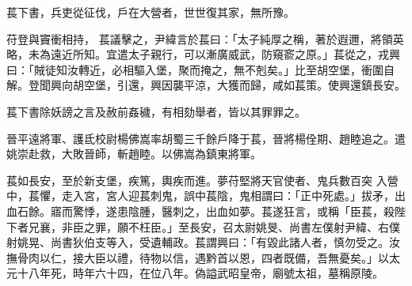 \begin{pinyinscope}
 萇下書，兵吏從征伐，戶在大營者，世世復其家，無所豫。



 苻登與竇衝相持，
 萇議擊之，尹緯言於萇曰：「太子純厚之稱，著於遐邇，將領英略，未為遠近所知。宜遣太子親行，可以漸廣威武，防窺窬之原。」萇從之，戎興曰：「賊徒知汝轉近，必相驅入堡，聚而掩之，無不剋矣。」比至胡空堡，衝圍自解。登聞興向胡空堡，引還，興因襲平涼，大獲而歸，咸如萇策。使興還鎮長安。



 萇下書除妖謗之言及赦前姦穢，有相劾舉者，皆以其罪罪之。



 晉平遠將軍、護氐校尉楊佛嵩率胡蜀三千餘戶降于萇，晉將楊佺期、趙睦追之。遣姚崇赴救，大敗晉師，斬趙睦。以佛嵩為鎮東將軍。



 萇如長安，至於新支堡，疾篤，輿疾而進。夢苻堅將天官使者、鬼兵數百突
 入營中，萇懼，走入宮，宮人迎萇刺鬼，誤中萇陰，鬼相謂曰：「正中死處。」拔矛，出血石餘。寤而驚悸，遂患陰腫，醫刺之，出血如夢。萇遂狂言，或稱「臣萇，殺陛下者兄襄，非臣之罪，願不枉臣。」至長安，召太尉姚旻、尚書左僕射尹緯、右僕射姚晃、尚書狄伯支等入，受遺輔政。萇謂興曰：「有毀此諸人者，慎勿受之。汝撫骨肉以仁，接大臣以禮，待物以信，遇黔首以恩，四者既備，吾無憂矣。」以太元十八年死，時年六十四，在位八年。偽謚武昭皇帝，廟號太祖，墓稱原陵。



\end{pinyinscope}